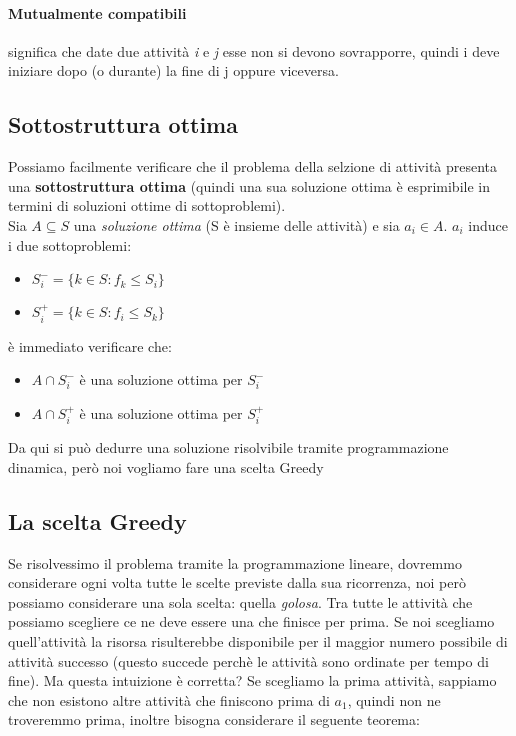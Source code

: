 \documentclass[12pt, a4paper, openany]{book}
\begin{document}
\paragraph{Mutualmente compatibili} significa che date due attività \emph{i} e \emph{j} esse non si devono sovrapporre, quindi i deve iniziare dopo (o durante) la fine di j oppure viceversa.

\subsection*{Sottostruttura ottima}
Possiamo facilmente verificare che il problema della selzione di attività presenta una \textbf{sottostruttura ottima} (quindi una sua soluzione ottima è esprimibile in termini di soluzioni ottime di sottoproblemi).
\\Sia $A \subseteq S$ una \emph{soluzione ottima} (S è insieme delle attività) e sia $a_i \in A$. $a_i$ induce i due sottoproblemi:
\begin{itemize}
	\item $S^-_i = \{k \in S : f_k \leq S_i\}$
	\item $S^+_i = \{k \in S : f_i \leq S_k\}$
\end{itemize}
è immediato verificare che:
\begin{itemize}
	\item $A \cap S^-_i$ è una soluzione ottima per $S^-_i$
	\item $A \cap S^+_i$ è una soluzione ottima per $S^+_i$
\end{itemize}
Da qui si può dedurre una soluzione risolvibile tramite programmazione dinamica, però noi vogliamo fare una scelta Greedy

\subsection*{La scelta Greedy}
Se risolvessimo il problema tramite la programmazione lineare, dovremmo considerare ogni volta tutte le scelte previste dalla sua ricorrenza, noi però possiamo considerare una sola scelta: quella \emph{golosa}.
Tra tutte le attività che possiamo scegliere ce ne deve essere una che finisce per prima. Se noi scegliamo quell'attività la risorsa risulterebbe disponibile per il maggior numero possibile di attività successo (questo succede perchè le attività sono ordinate per tempo di fine).
Ma questa intuizione è corretta? Se scegliamo la prima attività, sappiamo che non esistono altre attività che finiscono prima di $a_1$, quindi non ne troveremmo prima, inoltre bisogna considerare il seguente teorema:
\end{document}

